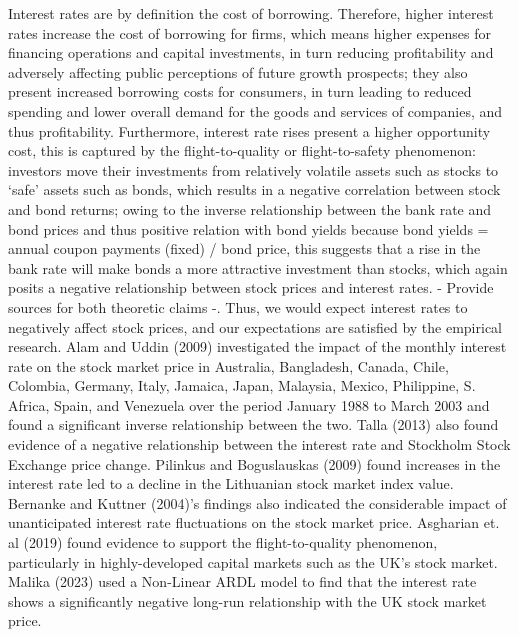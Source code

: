 \documentclass[12pt,a4paper]{article}
\begin{document}
Interest rates are by definition the cost of borrowing. Therefore, higher interest rates increase the cost of borrowing for firms, which means higher expenses for financing operations and capital investments, in turn reducing profitability and adversely affecting public perceptions of future growth prospects; they also present increased borrowing costs for consumers, in turn leading to reduced spending and lower overall demand for the goods and services of companies, and thus profitability. Furthermore, interest rate rises present a higher opportunity cost, this is captured by the flight-to-quality or flight-to-safety phenomenon: investors move their investments from relatively volatile assets such as stocks to ‘safe’ assets such as bonds, which results in a negative correlation between stock and bond returns; owing to the inverse relationship between the bank rate and bond prices and thus positive relation with bond yields because bond yields = annual coupon payments (fixed) / bond price, this suggests that a rise in the bank rate will make bonds a more attractive investment than stocks, which again posits a negative relationship between stock prices and interest rates. - Provide sources for both theoretic claims -. Thus, we would expect interest rates to negatively affect stock prices, and our expectations are satisfied by the empirical research. Alam and Uddin (2009) investigated the impact of the monthly interest rate on the stock market price in Australia, Bangladesh, Canada, Chile, Colombia, Germany, Italy, Jamaica, Japan, Malaysia, Mexico, Philippine, S. Africa, Spain, and Venezuela over the period January 1988 to March 2003 and found a significant inverse relationship between the two. Talla (2013) also found evidence of a negative relationship between the interest rate and Stockholm Stock Exchange price change. Pilinkus and Boguslauskas (2009) found increases in the interest rate led to a decline in the Lithuanian stock market index value. Bernanke and Kuttner (2004)’s findings also indicated the considerable impact of unanticipated interest rate fluctuations on the stock market price. Asgharian et. al (2019) found evidence to support the flight-to-quality phenomenon, particularly in highly-developed capital markets such as the UK’s stock market. Malika (2023) used a Non-Linear ARDL model to find that the interest rate shows a significantly negative long-run relationship with the UK stock market price.
\end{document}
